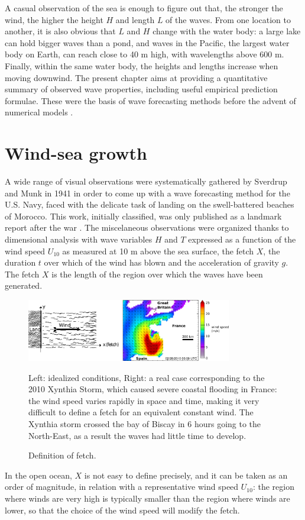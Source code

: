 A casual observation of the sea is enough to figure out that, the stronger the wind, the higher the height $H$ and length $L$
of the waves. From one location to another, it is also obvious that $L$ and $H$ change with the water body: a large lake can hold bigger waves than a pond, and waves in the 
Pacific, the largest water body on Earth, can reach close to 40 m high, with wavelengths above 600 m. Finally, within the same water body, the heights and lengths increase 
when moving downwind. The present chapter aims at providing a quantitative summary of observed wave properties, including useful empirical prediction formulae. These were the basis of
wave forecasting methods \citep[e.g.][]{Pierson&al.1955} before the advent of numerical models \citep{Gelci&al.1957}.

\section{Wind-sea growth}
A wide range of visual observations were systematically gathered by Sverdrup and Munk in 1941
in order to come up with a wave forecasting method for the U.S. Navy, faced with the delicate task of 
landing on the swell-battered beaches of Morocco. This work, initially classified, was only published as 
a landmark report after the war \citep{Sverdrup&Munk1947}. The miscelaneous observations were organized 
thanks to dimensional analysis with wave variables $H$ and $T$ expressed as a function of the wind speed 
$U_{10}$ as measured at 10 m above the sea surface, the fetch 
$X$, the duration $t$ over which of the wind has blown and the acceleration of gravity $g$. The fetch $X$ is the length 
of the region over which the waves have been generated. 

\begin{figure}[htb]
\centerline{\includegraphics[width=0.8\textwidth]{FIGS_CH_FETCH/fetch_schematic.pdf}}
  \caption{Definition of fetch.}{Left: idealized conditions, Right: a real case 
  corresponding to the 2010 Xynthia Storm, which caused severe coastal flooding in France: the wind speed varies rapidly 
  in space and time, making it very difficult to define a fetch for an equivalent constant wind. The Xynthia storm crossed the bay of Biscay 
  in 6 hours going to the North-East, as a result the waves had little time to develop.} \label{fig:fetch}
\end{figure}
In the open ocean, $X$ is not easy to define precisely, and it can 
be taken as an order of magnitude, in relation with a representative wind speed $U_{10}$: the region where winds are very high is typically smaller than the
region where winds are lower, so that the choice of the wind speed will modify the fetch. 

